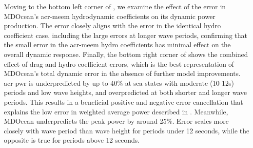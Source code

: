 Moving to the bottom left corner of , we examine the effect of the error in MDOcean's \gls{acr-meem} hydrodynamic coefficients on its dynamic power production.
The error closely aligns with the error in the identical hydro coefficient case, including the large errors at longer wave periods, confirming that the small error in the \gls{acr-meem} hydro coefficients has minimal effect on the overall dynamic response.
Finally, the bottom right corner of  shows the combined effect of drag and hydro coefficient errors, which is the best representation of MDOcean's total dynamic error in the absence of further model improvements.
\gls{acr-pwr} is underpredicted by up to 40\% at sea states with moderate (10-12s) periods and low wave heights, and overpredicted at both shorter and longer wave periods.
This results in a beneficial positive and negative error cancellation that explains the low error in weighted average power described in .
Meanwhile, MDOcean underpredicts the peak power by around 25\%.
Error scales more closely with wave period than wave height for periods under 12 seconds, while the opposite is true for periods above 12 seconds.

